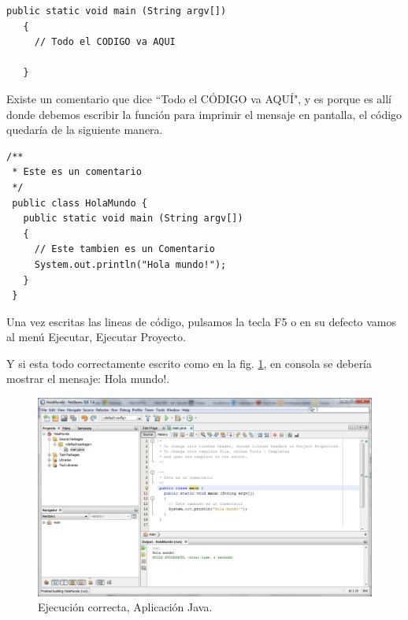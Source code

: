 \documentclass[12pt]{book} %
\begin{document}
\noindent
\begin{lstlisting}[frame=single]
   public static void main (String argv[])
   {
     // Todo el CODIGO va AQUI
     
   }
\end{lstlisting}

Existe un comentario que dice ``Todo el CÓDIGO va AQUÍ", y es porque es allí donde debemos escribir la función para imprimir el mensaje en pantalla, el código quedaría de la siguiente manera.

\noindent
%
\begin{lstlisting}[frame=single]
/**
 * Este es un comentario
 */
 public class HolaMundo {
   public static void main (String argv[])
   {
     // Este tambien es un Comentario
     System.out.println("Hola mundo!");
   }
 }
\end{lstlisting}

Una vez escritas las lineas de código, pulsamos la tecla F5 o en su defecto vamos al menú Ejecutar, Ejecutar Proyecto.

Y si esta todo correctamente escrito como en la fig. \ref{hw04}, en consola se debería mostrar el mensaje: Hola mundo!.

	\begin{figure}[h]
		\centering
			\includegraphics[width=16cm]{Hola_mundo_004.jpg}
			\caption{Ejecución correcta, Aplicación Java.}
			\label{hw04}
	\end{figure}
	
\end{document}
